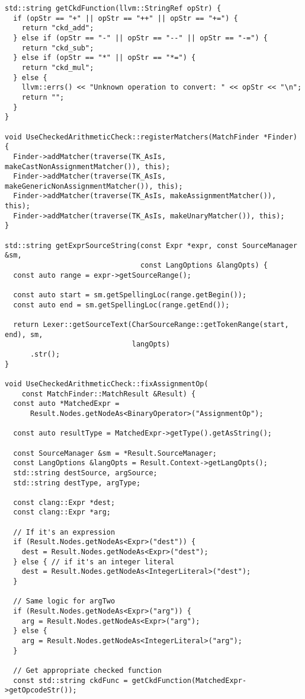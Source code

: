 {\begin{verbatim}
std::string getCkdFunction(llvm::StringRef opStr) {
  if (opStr == "+" || opStr == "++" || opStr == "+=") {
    return "ckd_add";
  } else if (opStr == "-" || opStr == "--" || opStr == "-=") {
    return "ckd_sub";
  } else if (opStr == "*" || opStr == "*=") {
    return "ckd_mul";
  } else {
    llvm::errs() << "Unknown operation to convert: " << opStr << "\n";
    return "";
  }
}

void UseCheckedArithmeticCheck::registerMatchers(MatchFinder *Finder) {
  Finder->addMatcher(traverse(TK_AsIs, makeCastNonAssignmentMatcher()), this);
  Finder->addMatcher(traverse(TK_AsIs, makeGenericNonAssignmentMatcher()), this);
  Finder->addMatcher(traverse(TK_AsIs, makeAssignmentMatcher()), this);
  Finder->addMatcher(traverse(TK_AsIs, makeUnaryMatcher()), this);
}

std::string getExprSourceString(const Expr *expr, const SourceManager &sm,
                                const LangOptions &langOpts) {
  const auto range = expr->getSourceRange();

  const auto start = sm.getSpellingLoc(range.getBegin());
  const auto end = sm.getSpellingLoc(range.getEnd());

  return Lexer::getSourceText(CharSourceRange::getTokenRange(start, end), sm,
                              langOpts)
      .str();
}

void UseCheckedArithmeticCheck::fixAssignmentOp(
    const MatchFinder::MatchResult &Result) {
  const auto *MatchedExpr =
      Result.Nodes.getNodeAs<BinaryOperator>("AssignmentOp");

  const auto resultType = MatchedExpr->getType().getAsString();

  const SourceManager &sm = *Result.SourceManager;
  const LangOptions &langOpts = Result.Context->getLangOpts();
  std::string destSource, argSource;
  std::string destType, argType;

  const clang::Expr *dest;
  const clang::Expr *arg;

  // If it's an expression
  if (Result.Nodes.getNodeAs<Expr>("dest")) {
    dest = Result.Nodes.getNodeAs<Expr>("dest");
  } else { // if it's an integer literal
    dest = Result.Nodes.getNodeAs<IntegerLiteral>("dest");
  }

  // Same logic for argTwo
  if (Result.Nodes.getNodeAs<Expr>("arg")) {
    arg = Result.Nodes.getNodeAs<Expr>("arg");
  } else {
    arg = Result.Nodes.getNodeAs<IntegerLiteral>("arg");
  }

  // Get appropriate checked function
  const std::string ckdFunc = getCkdFunction(MatchedExpr->getOpcodeStr());


\end{verbatim}}

